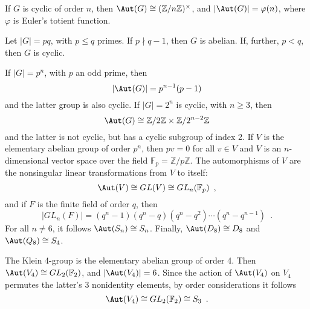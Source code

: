 \begin{proposition}
	\cite[135]{DummitFoote2004}
	If $G$ is cyclic of order $n$, then $\Aut(G) \cong (\mathbb{Z} / n \mathbb{Z})^\times$,
	and $|\Aut(G)| = \varphi(n)$, where $\varphi$ is Euler's totient function.
\end{proposition}

\begin{corollary}
	\cite[136]{DummitFoote2004}
	Let $|G| = pq$, with $p \leq q$ primes. If $p \nmid q - 1$, then $G$ is abelian.
	If, further, $p < q$, then $G$ is cyclic.
\end{corollary}

\begin{proposition}
	\cite[136]{DummitFoote2004}
	If $|G| = p^n$, with $p$ an odd prime, then
	\begin{equation}
		|\Aut(G)| = p^{n - 1} (p - 1)
	\end{equation}
	and the latter group is also cyclic. If $|G| = 2^n$ is cyclic, with $n \geq 3$, then
	\begin{equation}
		\Aut(G) \cong \mathbb{Z} / 2 \mathbb{Z} \times \mathbb{Z} / 2^{n - 2} \mathbb{Z}
	\end{equation}
	and the latter is not cyclic, but has a cyclic subgroup of index 2. If $V$ is the
	elementary abelian group of order $p^n$, then $pv = 0$ for all $v \in V$ and $V$ is an
	$n$-dimensional vector space over the field $\mathbb{F}_p = \mathbb{Z} / p \mathbb{Z}$.
	The automorphisms of $V$ are the nonsingular linear transformations from $V$ to itself:
	\begin{equation}
		\Aut(V) \cong GL(V) \cong GL_n(\mathbb{F}_p) \enspace,
	\end{equation}
	and if $F$ is the finite field of order $q$, then
	\begin{equation}
		|GL_n(F)| = (q^n - 1) (q^n - q) (q^n - q^2) \cdots (q^n - q^{n - 1}) \enspace.
	\end{equation}
	For all $n \ne 6$, it follows $\Aut(S_n) \cong S_n$. Finally, $\Aut(D_8) \cong D_8$ and
	$\Aut(Q_8) \cong S_4$.
\end{proposition}

\begin{example}
	\cite[137]{DummitFoote2004}
	The Klein 4-group is the elementary abelian group of order 4. Then
	$\Aut(V_4) \cong GL_2(\mathbb{F}_2)$, and $|\Aut(V_4)| = 6$. Since the action of
	$\Aut(V_4)$ on $V_4$ permutes the latter's 3 nonidentity elements, by order
	considerations it follows
	\begin{equation}
		\Aut(V_4) \cong GL_2(\mathbb{F}_2) \cong S_3 \enspace.
	\end{equation}
\end{example}

